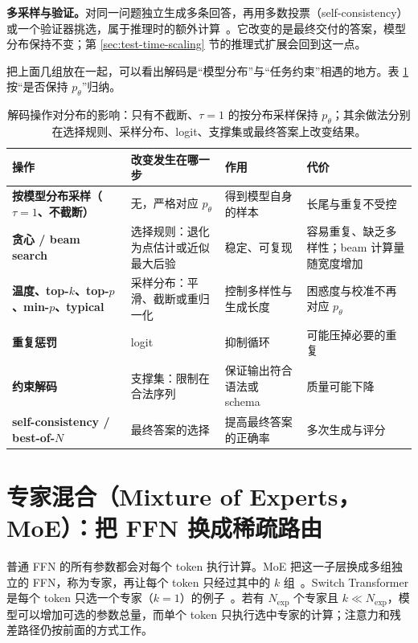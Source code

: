 \textbf{多采样与验证。}对同一问题独立生成多条回答，再用多数投票（self-consistency）或一个验证器挑选，属于推理时的额外计算~\cite{wang2023selfconsistency}。它改变的是最终交付的答案，模型分布保持不变；第 \ref{sec:test-time-scaling} 节的推理式扩展会回到这一点。

把上面几组放在一起，可以看出解码是“模型分布”与“任务约束”相遇的地方。表 \ref{tab:decoding-ops} 按“是否保持 \(p_\theta\)”归纳。

\begin{table}[H]
\centering\small
\begin{tabularx}{\textwidth}{>{\bfseries}p{40mm} p{30mm} X X}
\toprule
操作 & 改变发生在哪一步 & 作用 & 代价\\
\midrule
按模型分布采样（\(\tau=1\)、不截断） & 无，严格对应 \(p_\theta\) & 得到模型自身的样本 & 长尾与重复不受控\\
贪心 / beam search & 选择规则：退化为点估计或近似最大后验 & 稳定、可复现 & 容易重复、缺乏多样性；beam 计算量随宽度增加\\
温度、top-\(k\)、top-\(p\)、min-\(p\)、typical & 采样分布：平滑、截断或重归一化 & 控制多样性与生成长度 & 困惑度与校准不再对应 \(p_\theta\)\\
重复惩罚 & logit & 抑制循环 & 可能压掉必要的重复\\
约束解码 & 支撑集：限制在合法序列 & 保证输出符合语法或 schema & 质量可能下降\\
self-consistency / best-of-\(N\) & 最终答案的选择 & 提高最终答案的正确率 & 多次生成与评分\\
\bottomrule
\end{tabularx}
\caption{解码操作对分布的影响：只有不截断、\(\tau=1\) 的按分布采样保持 \(p_\theta\)；其余做法分别在选择规则、采样分布、logit、支撑集或最终答案上改变结果。}
\label{tab:decoding-ops}
\end{table}

\section{专家混合（Mixture of Experts，MoE）：把 FFN 换成稀疏路由}
\label{sec:moe}

普通 FFN 的所有参数都会对每个 token 执行计算。MoE 把这一子层换成多组独立的 FFN，称为专家，再让每个 token 只经过其中的 \(k\) 组~\cite{shazeer2017moe}。Switch Transformer 是每个 token 只选一个专家（\(k=1\)）的例子~\cite{fedus2022switch}。若有 \(N_{\mathrm{exp}}\) 个专家且 \(k\ll N_{\mathrm{exp}}\)，模型可以增加可选的参数总量，而单个 token 只执行选中专家的计算；注意力和残差路径仍按前面的方式工作。

